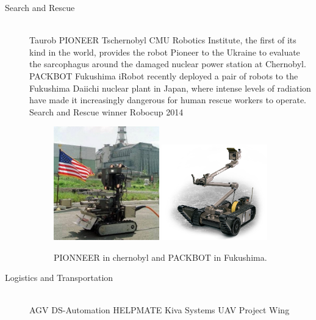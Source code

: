 \begin{description}
\item[Search and Rescue]\hfill \\
Taurob
PIONEER Tschernobyl
CMU Robotics Institute, the first of its kind in the world, provides the robot Pioneer to the Ukraine to evaluate the sarcophagus around the damaged nuclear power station at Chernobyl. 
PACKBOT Fukushima
iRobot recently deployed a pair of robots to the Fukushima Daiichi nuclear plant in Japan, where intense levels of radiation have made it increasingly dangerous for human rescue workers to operate.
Search and Rescue winner Robocup 2014
\begin{figure}[thpb]
	  \myfloatalign
      \footnotesize
      \centering
    \subfloat
    {  \label{fig:fig_chernobyl}
        \includegraphics[width=0.45\textwidth]{figures/fig_chernobyl_pioneer.jpg}
    }
    \subfloat
    {  \label{fig:fig_fukushima}
        \includegraphics[width=0.45\textwidth]{figures/fig_packbot.png}
    }     
   \caption[Rescue robots]{PIONNEER in chernobyl and PACKBOT in Fukushima.}
   \label{fig:fig_rescue}
\end{figure}

\item[Logistics and Transportation]\hfill \\
AGV DS-Automation
HELPMATE
Kiva Systems \cite{kiva}
UAV Project Wing


\end{description}
